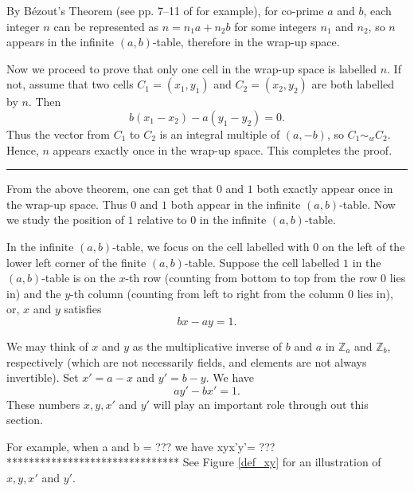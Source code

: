 \documentclass[a4paper,12pt]{article}
\def\proof{\noindent {\it{Proof.} \hskip 2pt}}
\newcommand{\qed}{{\hfill\rule{4pt}{7pt}}}
\begin{document}
\proof
%
%
%
%
By B\'ezout's Theorem (see pp. 7--11 of \cite{bezout} for example), for co-prime $a$ and $b$, each integer $n$ can be represented as $n=n_1a+n_2b$ for some integers $n_1$ and $n_2$, so $n$ appears in the infinite $(a,b)$-table, therefore in the wrap-up space.

Now we proceed to prove that only one cell in the wrap-up space is labelled  $n$. If not, assume that two cells $C_1=(x_1,y_1)$ and $C_2=(x_2,y_2)$ are both labelled by $n$. Then $$b(x_1-x_2)-a(y_1-y_2)=0.$$ Thus the vector from $C_1$ to $C_2$ is an integral multiple of $(a,-b)$, so $C_1\sim_w C_2$. Hence, $n$ appears  exactly once in the wrap-up space. This completes the proof.
\qed


From the above theorem, one can get that $0$ and $1$ both exactly appear once in the wrap-up space. Thus $0$ and $1$ both appear in the infinite $(a,b)$-table. Now we study the position of $1$ relative to  $0$ in the infinite $(a,b)$-table.

In the infinite $(a,b)$-table, we focus on the cell labelled with $0$ on the left of the lower left corner of the finite $(a,b)$-table. %
Suppose the cell labelled $1$ in the $(a,b)$-table is on the $x$-th row (counting from bottom to top from the row $0$ lies in) and the $y$-th column (counting from left to right from the column $0$ lies in), or, $x$ and $y$ satisfies
             $$bx-ay=1.$$

We may think of $x$ and $y$ as the multiplicative inverse of $b$ and $a$ in $\mathbb{Z}_a$ and $\mathbb{Z}_b$, respectively (which are not necessarily  fields, and elements are not always invertible).
Set $x'=a-x$ and $y'=b-y$. We have
$$ay'-bx'=1.$$
These numbers $x,y,x'$ and $y'$ will play an important role through out this section.

 For example, when  a and b = ??? we have xyx'y'= ???
 *******************************
 See Figure \ref{def_xy} for an illustration of $x,y,x'$ and $y'$.

\end{document}
